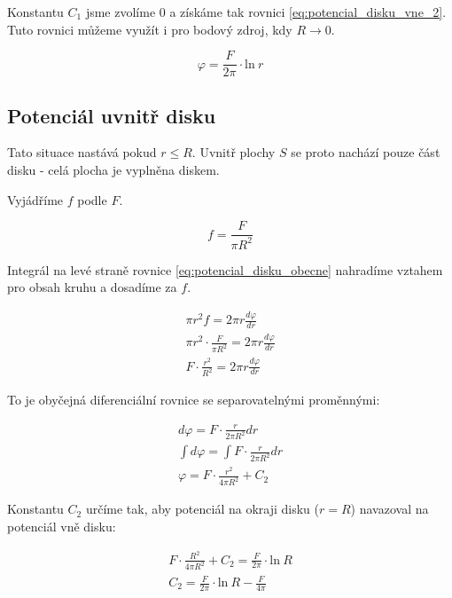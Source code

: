 \documentclass{book}
\begin{document}
Konstantu \(C_1\) jsme zvolíme 0 a získáme tak rovnici \eqref{eq:potencial_disku_vne_2}. Tuto rovnici můžeme využít i pro bodový zdroj, kdy \(R \rightarrow 0\).

\begin{equation}
\label{eq:potencial_disku_vne_2}
\varphi = \frac{F}{2 \pi} \cdot \mathrm{ln} \ r
\end{equation}

\subsection{Potenciál uvnitř disku}

Tato situace nastává pokud \(r \leq R\). Uvnitř plochy \(S\) se proto nachází pouze část disku - celá plocha je vyplněna diskem.

Vyjádříme \(f\) podle \(F\).

\begin{equation}
f = \frac{F}{\pi R^2}
\end{equation}

Integrál na levé straně rovnice \eqref{eq:potencial_disku_obecne} nahradíme vztahem pro obsah kruhu a dosadíme za \(f\).

\begin{equation}
\begin{split}
\pi r^2 f = 2 \pi r \frac{d \varphi}{dr} \\
\pi r^2 \cdot \frac{F}{\pi R^2} = 2 \pi r \frac{d \varphi}{dr} \\
F \cdot \frac{r^2}{R^2} = 2 \pi r \frac{d \varphi}{dr}
\end{split}
\end{equation}

To je obyčejná diferenciální rovnice se separovatelnými proměnnými:

\begin{equation}
\label{eq:potencial_disku_uvnitr}
\begin{split}
d \varphi = F \cdot \frac{r}{2 \pi R^2} dr \\
\int d \varphi = \int F \cdot \frac{r}{2 \pi R^2} dr \\
\varphi = F \cdot \frac{r^2}{4 \pi R^2} + C_2
\end{split}
\end{equation}

Konstantu \(C_2\) určíme tak, aby potenciál na okraji disku (\(r = R\)) navazoval na potenciál vně disku:

\begin{equation}
\begin{split}
F \cdot \frac{R^2}{4 \pi R^2} + C_2 = \frac{F}{2 \pi} \cdot \mathrm{ln} \ R \\
C_2 = \frac{F}{2 \pi} \cdot \mathrm{ln} \ R - \frac{F}{4 \pi}
\end{split}
\end{equation}
\end{document}
